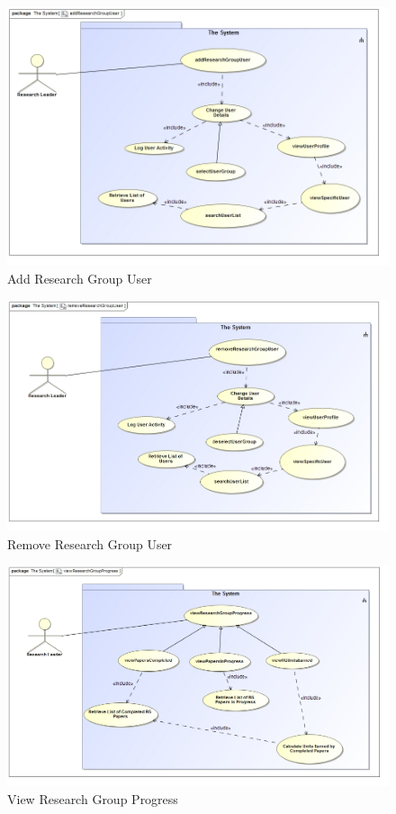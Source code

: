 \documentclass[a4paper,12pt]{article}
\begin{document}
\begin{figure}[H]
    \centering
    \caption{Add Research Group User}
    \includegraphics[width=1\textwidth]{req-func/uc__The_System__addResearchGroupUser.jpg}
\end{figure}

\begin{figure}[H]
    \centering
    \caption{Remove Research Group User}
    \includegraphics[width=1\textwidth]{req-func/uc__The_System__removeResearchGroupUser.jpg}
\end{figure}

\begin{figure}[H]
    \centering
    \caption{View Research Group Progress}
    \includegraphics[width=1\textwidth]{req-func/uc__The_System__viewResearchGroupProgress.jpg}
\end{figure}
\end{document}
